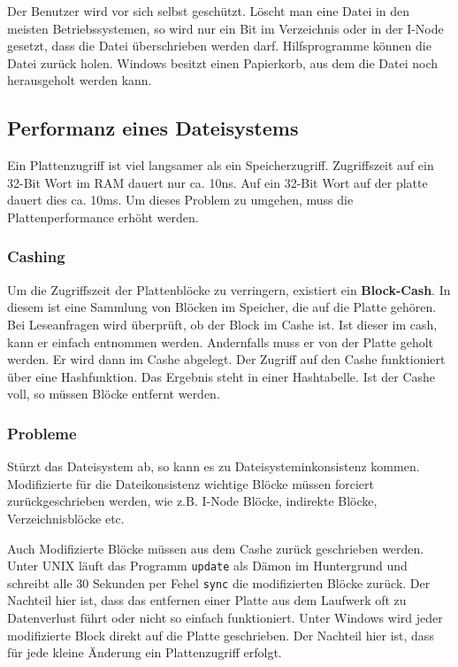 Der Benutzer wird vor sich selbst geschützt. Löscht man eine Datei in den
meisten Betriebssystemen, so wird nur ein Bit im Verzeichnis oder in der I-Node
gesetzt, dass die Datei überschrieben werden darf. Hilfsprogramme können die
Datei zurück holen. Windows besitzt einen Papierkorb, aus dem die Datei noch
herausgeholt werden kann.

\subsection{Performanz eines Dateisystems}

Ein Plattenzugriff ist viel langsamer als ein Speicherzugriff. Zugriffszeit auf
ein 32-Bit Wort im RAM dauert nur ca. 10ns. Auf ein 32-Bit Wort auf der platte
dauert dies ca. 10ms. Um dieses Problem zu umgehen, muss die Plattenperformance
erhöht werden.

\subsubsection{Cashing}

Um die Zugriffszeit der Plattenblöcke zu verringern, existiert ein
\textbf{Block-Cash}. In diesem ist eine Sammlung von Blöcken im Speicher, die
auf die Platte gehören. Bei Leseanfragen wird überprüft, ob der Block im Cashe
ist. Ist dieser im cash, kann er einfach entnommen werden. Andernfalls muss er
von der Platte geholt werden. Er wird dann im Cashe abgelegt. Der Zugriff auf
den Cashe funktioniert über eine Hashfunktion. Das Ergebnis steht in einer
Hashtabelle. Ist der Cashe voll, so müssen Blöcke entfernt werden.

\subsubsection{Probleme}

Stürzt das Dateisystem ab, so kann es zu Dateisysteminkonsistenz kommen.
Modifizierte für die Dateikonsistenz wichtige Blöcke müssen forciert
zurückgeschrieben werden, wie z.B. I-Node Blöcke, indirekte Blöcke,
Verzeichnisblöcke etc.

Auch Modifizierte Blöcke müssen aus dem Cashe zurück geschrieben werden. Unter
UNIX läuft das Programm \texttt{update} als Dämon im Huntergrund und schreibt
alle 30 Sekunden per Fehel \texttt{sync} die modifizierten Blöcke zurück. Der
Nachteil hier ist, dass das entfernen einer Platte aus dem Laufwerk oft zu
Datenverlust führt oder nicht so einfach funktioniert. Unter Windows wird jeder
modifizierte Block direkt auf die Platte geschrieben. Der Nachteil hier ist,
dass für jede kleine Änderung ein Plattenzugriff erfolgt.


